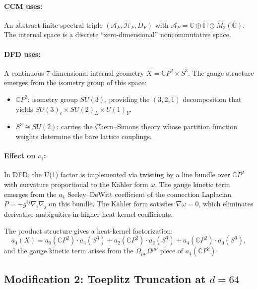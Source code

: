 \documentclass[12pt,a4paper]{article}
\begin{document}
\paragraph{CCM uses:} An abstract finite spectral triple
$(\mathcal{A}_F, \mathcal{H}_F, D_F)$ with
$\mathcal{A}_F = \mathbb{C} \oplus \mathbb{H} \oplus M_3(\mathbb{C})$.
The internal space is a discrete ``zero-dimensional'' noncommutative space.

\paragraph{DFD uses:} A continuous 7-dimensional internal geometry
$X = \mathbb{C}P^2 \times S^3$.  The gauge structure emerges from the
isometry group of this space:
\begin{itemize}
\item $\mathbb{C}P^2$: isometry group $SU(3)$, providing the $(3,2,1)$
  decomposition that yields $SU(3)_c \times SU(2)_L \times U(1)_Y$.
\item $S^3 \cong SU(2)$: carries the Chern--Simons theory whose partition
  function weights determine the bare lattice couplings.
\end{itemize}

\paragraph{Effect on $c_1$:}
In DFD, the U(1) factor is implemented via twisting by a line bundle over
$\mathbb{C}P^2$ with curvature proportional to the K\"ahler form $\omega$.
The gauge kinetic term emerges from the $a_4$ Seeley--DeWitt coefficient of
the connection Laplacian $P = -g^{ij}\nabla_i\nabla_j$ on this bundle.
The K\"ahler form satisfies $\nabla\omega = 0$, which eliminates derivative
ambiguities in higher heat-kernel coefficients.

The product structure gives a heat-kernel factorization:
\begin{equation}
a_4(X) = a_0(\mathbb{C}P^2) \cdot a_4(S^3)
+ a_2(\mathbb{C}P^2) \cdot a_2(S^3)
+ a_4(\mathbb{C}P^2) \cdot a_0(S^3),
\end{equation}
and the gauge kinetic term arises from the
$\Omega_{\mu\nu}\Omega^{\mu\nu}$ piece of $a_4(\mathbb{C}P^2)$.

\subsection{Modification 2: Toeplitz Truncation at $d = 64$}
\label{sec:mod-toeplitz}
\end{document}
